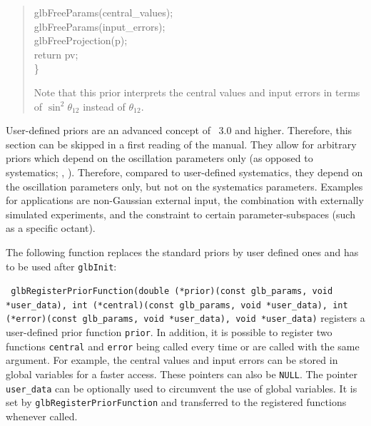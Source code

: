 {\begin{quote}
{{  \hspace*{0.5cm} glbFreeParams(central\_values); \\
  \hspace*{0.5cm} glbFreeParams(input\_errors); \\
  \hspace*{0.5cm} glbFreeProjection(p); \\
  \hspace*{0.5cm} return pv; \\
\}
}
}

Note that this prior interprets the central values and input errors in terms of  $\sin^2 \theta_{12}$
instead of $\theta_{12}$.
\end{quote}
}

User-defined priors are an advanced concept of \GLOBES\ 3.0 and higher. Therefore,
this section can be skipped in a first reading of the manual.
They allow for arbitrary priors which depend on the oscillation parameters only (as opposed
to systematics; \cf, ).
Therefore, compared to user-defined systematics, they depend on the oscillation
parameters only, but not on the systematics parameters. Examples for applications
are non-Gaussian external input, the combination with externally simulated experiments, and the
constraint to certain parameter-subspaces (such as a specific octant).

The following function replaces the standard priors by user defined ones and has to be used
after {\tt glbInit}:
\begin{function}
{\tt 
glbRegisterPriorFunction(double (*prior)(const glb\_params, void *user\_data), int (*central)(const glb\_params, void *user\_data), int (*error)(const glb\_params, void *user\_data),  void *user\_data)} registers a user-defined prior function {\tt prior}. In addition, it is possible to register
two functions {\tt central} and {\tt error} being called every time  or  are called with the same argument. For example, the central values and input errors can be stored in
global variables for a faster access. These pointers can also be {\tt NULL}. The pointer {\tt user\_data} can be optionally used to circumvent the use of global variables. It is set by {\tt glbRegisterPriorFunction} and transferred to the registered functions whenever called.
\end{function}

